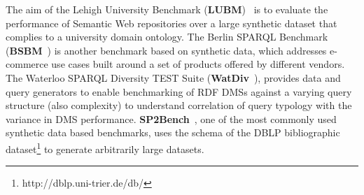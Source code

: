 \documentclass{llncs}
\begin{document}
    The aim of the Lehigh University Benchmark (\textbf{LUBM})~\cite{Guo:2005:LBO:1741305.1741322} is to evaluate the performance of Semantic Web repositories over a large synthetic dataset that complies to a university domain ontology.
    The Berlin SPARQL Benchmark (\textbf{BSBM}~\cite{Bizer2009TheBS}) is another benchmark based on synthetic data, which addresses e-commerce use cases built around a set of products offered by different vendors.
    The Waterloo SPARQL Diversity TEST Suite (\textbf{WatDiv}~\cite{alucc2014diversified}), provides data and query generators to enable benchmarking of RDF DMSs against a varying query structure (also complexity) to understand correlation of query typology with the variance in DMS performance.
    \textbf{SP2Bench}~\cite{books/sp/virgilio09/SchmidtHMPL09}, one of the most commonly used synthetic data based benchmarks,
    uses the schema of the DBLP bibliographic dataset\footnote{http://dblp.uni-trier.de/db/} to generate arbitrarily large datasets. 
   
\end{document}
